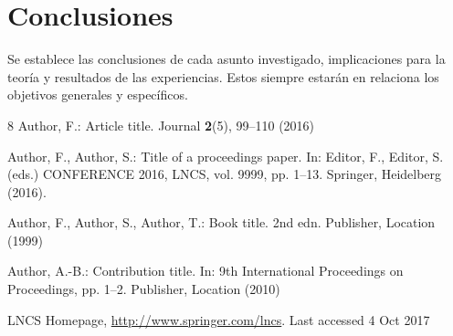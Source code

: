 \documentclass[runningheads]{llncs}
\begin{document}
\section{Conclusiones}
Se establece las conclusiones de cada asunto investigado, implicaciones para la teoría y resultados de las
experiencias. Estos siempre estarán en relaciona los objetivos generales y específicos.

% 
% 

\begin{thebibliography}{8}
Author, F.: Article title. Journal \textbf{2}(5), 99--110 (2016)

Author, F., Author, S.: Title of a proceedings paper. In: Editor,
F., Editor, S. (eds.) CONFERENCE 2016, LNCS, vol. 9999, pp. 1--13.
Springer, Heidelberg (2016). 

Author, F., Author, S., Author, T.: Book title. 2nd edn. Publisher,
Location (1999)

Author, A.-B.: Contribution title. In: 9th International Proceedings
on Proceedings, pp. 1--2. Publisher, Location (2010)

LNCS Homepage, \url{http://www.springer.com/lncs}. Last accessed 4
Oct 2017
\end{thebibliography}
\end{document}
